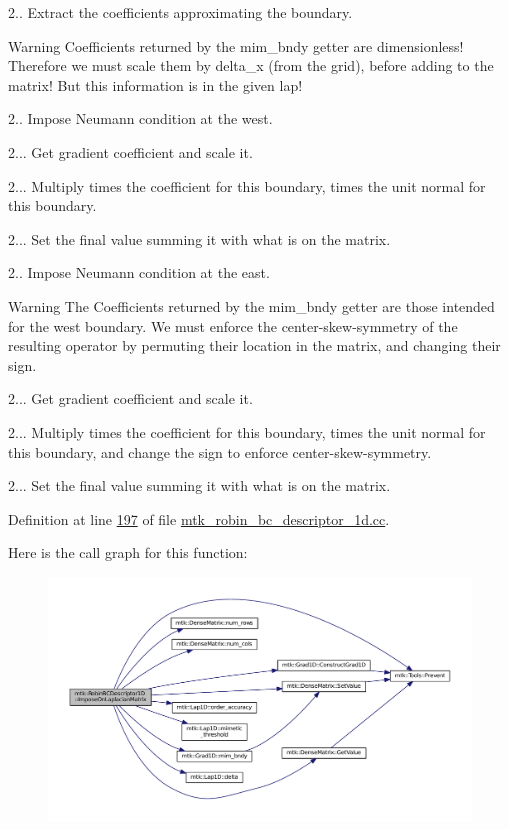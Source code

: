 2.. Extract the coefficients approximating the boundary.

\begin{DoxyWarning}{Warning}
Coefficients returned by the mim\+\_\+bndy getter are dimensionless! Therefore we must scale them by delta\+\_\+x (from the grid), before adding to the matrix! But this information is in the given lap!
\end{DoxyWarning}
2.. Impose Neumann condition at the west.

2... Get gradient coefficient and scale it.

2... Multiply times the coefficient for this boundary, times the unit normal for this boundary.

2... Set the final value summing it with what is on the matrix.

2.. Impose Neumann condition at the east.

\begin{DoxyWarning}{Warning}
The Coefficients returned by the mim\+\_\+bndy getter are those intended for the west boundary. We must enforce the center-\/skew-\/symmetry of the resulting operator by permuting their location in the matrix, and changing their sign.
\end{DoxyWarning}
2... Get gradient coefficient and scale it.

2... Multiply times the coefficient for this boundary, times the unit normal for this boundary, and change the sign to enforce center-\/skew-\/symmetry.

2... Set the final value summing it with what is on the matrix. 

Definition at line \hyperlink{mtk__robin__bc__descriptor__1d_8cc_source_l00197}{197} of file \hyperlink{mtk__robin__bc__descriptor__1d_8cc_source}{mtk\+\_\+robin\+\_\+bc\+\_\+descriptor\+\_\+1d.\+cc}.



Here is the call graph for this function\+:\nopagebreak
\begin{figure}[H]
\begin{center}
\leavevmode
\includegraphics[width=350pt]{classmtk_1_1RobinBCDescriptor1D_ab8446428df923c27f388a85bd3f2c6d4_cgraph}
\end{center}
\end{figure}



